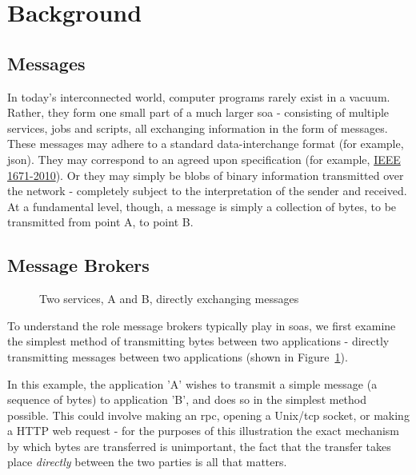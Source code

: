 \section{Background}
\label{sec:Background}

\subsection{Messages}
\label{sub:Messages}

In today's interconnected world, computer programs rarely exist in a vacuum.
Rather, they form one small part of a much larger \gls{soa} -
consisting of multiple services, jobs and scripts, all exchanging information in
the form of messages. These messages may adhere to a standard data-interchange
format (for example, \gls{json}). They may correspond to an agreed upon
specification (for example, \href{https://goo.gl/rjuP4C}{IEEE 1671-2010}).
Or they may simply be blobs of binary information transmitted over the network -
completely subject to the interpretation of the sender and received.
At a fundamental level, though, a message is simply a collection of bytes, to be
transmitted from point A, to point B.

\subsection{Message Brokers}
\label{sub:What is a message broker?}

\begin{figure}[ht]
  \centering
  
  \caption{Two services, A and B, directly exchanging messages}
  \label{fig:tikz:directMessaging}
\end{figure}

To understand the role message brokers typically play in \glspl{soa}, we first
examine the simplest method of transmitting bytes between two applications -
directly transmitting messages between two applications (shown in
Figure~\ref{fig:tikz:directMessaging}).

In this example, the application 'A' wishes to transmit a simple message
(a sequence of bytes) to application 'B', and does so in the simplest method
possible. This could involve making an \gls{rpc}, opening a Unix/\gls{tcp} socket,
or making a HTTP web request - for the purposes of this illustration the exact
mechanism by which bytes are transferred is unimportant, the fact
that the transfer takes place \emph{directly} between the two parties is all that
matters.

